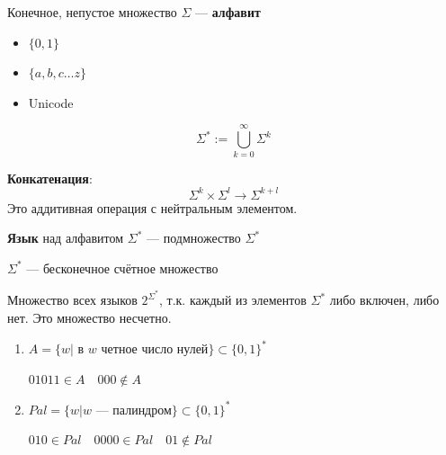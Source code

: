

\cfoot{}

\usepackage{listings}
\usepackage{courier}
\lstset{basicstyle=\footnotesize\ttfamily,breaklines=true}
\lstset{framextopmargin=50pt,frame=bottomline}



\begin{definition}
    Конечное, непустое множество $\Sigma$ --- \textbf{алфавит}
\end{definition}

\begin{example}
    \begin{itemize}
        \item $\{0, 1\}$
        \item $\{a, b, c\ldots z\}$
        \item Unicode
    \end{itemize}
\end{example}

$$\Sigma^*:=\bigcup_{k=0}^\infty \Sigma^k$$

\begin{definition}
    \textbf{Конкатенация}:
    $$\Sigma^k\times \Sigma^l \to \Sigma^{k+l}$$
    Это аддитивная операция с нейтральным элементом.
\end{definition}

\begin{definition}
    \textbf{Язык} над алфавитом $\Sigma^*$ --- подмножество $\Sigma^*$
\end{definition}

$\Sigma^*$ --- бесконечное счётное множество

Множество всех языков $2^{\Sigma^*}$, т.к. каждый из элементов $\Sigma^*$ либо включен, либо нет. Это множество несчетно.

\begin{example}
    \begin{enumerate}
        \item $A=\{w | \text{ в } w \text{ четное число нулей}\}\subset \{0, 1\}^*$
        
        $01011\in A \quad 000\not\in A$
        \item $Pal=\{w | w \text{ --- палиндром}\}\subset \{0, 1\}^*$
        
        $010\in Pal \quad 0000\in Pal \quad 01\not\in Pal$
    \end{enumerate}
\end{example}

